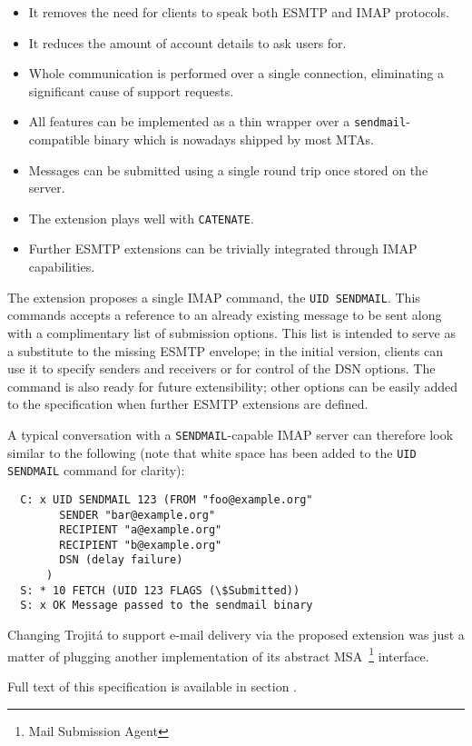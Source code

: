 \documentclass[trojita]{subfiles}
\begin{document}
\begin{itemize}
  \item It removes the need for clients to speak both ESMTP and IMAP protocols.
  \item It reduces the amount of account details to ask users for.
  \item Whole communication is performed over a single connection, eliminating a significant cause of support requests.
  \item All features can be implemented as a thin wrapper over a {\tt sendmail}-compatible binary which is nowadays
    shipped by most MTAs.
  \item Messages can be submitted using a single round trip once stored on the server.
  \item The extension plays well with {\tt CATENATE}.
  \item Further ESMTP extensions can be trivially integrated through IMAP capabilities.
\end{itemize}

The extension proposes a single IMAP command, the {\tt UID SENDMAIL}.  This commands accepts a reference to an already
existing message to be sent along with a complimentary list of submission options.  This list is intended to serve as a
substitute to the missing ESMTP envelope; in the initial version, clients can use it to specify senders and receivers or
for control of the DSN options.  The command is also ready for future extensibility; other options can be easily added
to the specification when further ESMTP extensions are defined.

A typical conversation with a {\tt SENDMAIL}-capable IMAP server can therefore look similar to the following (note that
white space has been added to the {\tt UID SENDMAIL} command for clarity):

\begin{verbatim}
  C: x UID SENDMAIL 123 (FROM "foo@example.org"
        SENDER "bar@example.org"
        RECIPIENT "a@example.org"
        RECIPIENT "b@example.org"
        DSN (delay failure)
      )
  S: * 10 FETCH (UID 123 FLAGS (\$Submitted))
  S: x OK Message passed to the sendmail binary
\end{verbatim}

Changing Trojitá to support e-mail delivery via the proposed extension was just a matter of plugging another
implementation of its abstract MSA~\footnote{Mail Submission Agent} interface.

Full text of this specification is available in section .
\end{document}
